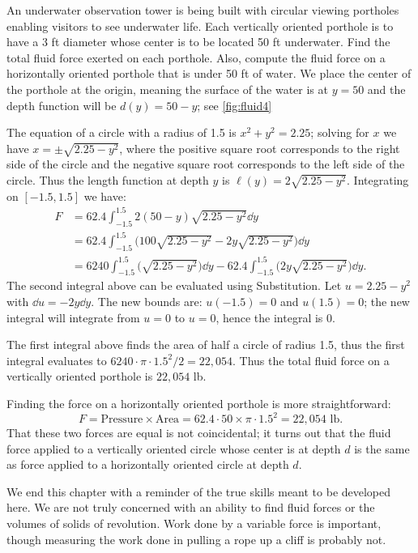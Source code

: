 \begin{example}\label{ex_fluid4}%
An underwater observation tower is being built with circular viewing portholes enabling visitors to see underwater life. Each vertically oriented porthole is to have a 3 ft diameter whose center is to be located 50 ft underwater. Find the total fluid force exerted on each porthole. Also, compute the fluid force on a horizontally oriented porthole that is under 50 ft of water.
\solution
We place the center of the porthole at the origin, meaning the surface of the water is at $y=50$ and the depth function will be $d(y)=50-y$; see \autoref{fig:fluid4} 

The equation of a circle with a radius of 1.5 is $x^2+y^2=2.25$; solving for $x$ we have $x=\pm \sqrt{2.25-y^2}$, where the positive square root corresponds to the right side of the circle and the negative square root corresponds to the left side of the circle. Thus the length function at depth $y$ is $\ell(y) = 2\sqrt{2.25-y^2}$. Integrating on $[-1.5,1.5]$ we have:
\begin{align*}
	F
	&= 62.4\int_{-1.5}^{1.5} 2(50-y)\sqrt{2.25-y^2}\dd y \\
	&= 62.4\int_{-1.5}^{1.5} \bigl(100\sqrt{2.25-y^2} - 2y\sqrt{2.25-y^2}\bigr)\dd y \\
	&= 6240\int_{-1.5}^{1.5} \bigl(\sqrt{2.25-y^2}\bigr)\dd y - 62.4\int_{-1.5}^{1.5} \bigl(2y\sqrt{2.25-y^2}\bigr)\dd y.
\end{align*}			
The second integral above can be evaluated using Substitution. Let $u=2.25-y^2$ with $\dd u = -2y\dd y$. The new bounds are: $u(-1.5)=0$ and $u(1.5)=0$; the new integral will integrate from $u=0$ to $u=0$, hence the integral is 0.

The first integral above finds the area of half a circle of radius 1.5, thus the first integral evaluates to $6240\cdot\pi\cdot1.5^2/2 = 22,054$. Thus the total fluid force on a vertically oriented porthole is $22,054$ lb.

Finding the force on a horizontally oriented porthole is more straightforward:
\[
F = \text{Pressure}\times\text{Area} = 62.4\cdot50\times \pi\cdot1.5^2
 = 22,054\text{ lb}.
\]
That these two forces are equal is not coincidental; it turns out that the fluid force applied to a vertically oriented circle whose center is at depth $d$ is the same as force applied to a horizontally oriented circle at depth $d$.
\end{example}

We end this chapter with a reminder of the true skills meant to be developed here. We are not truly concerned with an ability to find fluid forces or the volumes of solids of revolution. Work done by a variable force is important, though measuring the work done in pulling a rope up a cliff is probably not.

